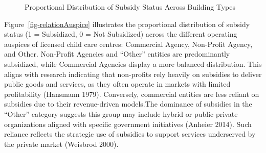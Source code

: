\documentclass[
  letterpaper,
  DIV=11,
  numbers=noendperiod]{scrartcl}
\begin{document}
\begin{figure}


\caption{\label{fig-relationbldgtype}Proportional Distribution of
Subsidy Status Across Building Types}

\end{figure}%

Figure~\ref{fig-relationAuspice} illustrates the proportional
distribution of subsidy status (1 = Subsidized, 0 = Not Subsidized)
across the different operating auspices of licensed child care centres:
Commercial Agency, Non-Profit Agency, and Other. Non-Profit Agencies and
``Other'' entities are predominantly subsidized, while Commercial
Agencies display a more balanced distribution. This aligns with research
indicating that non-profits rely heavily on subsidies to deliver public
goods and services, as they often operate in markets with limited
profitability (Hansmann 1979). Conversely, commercial entities are less
reliant on subsidies due to their revenue-driven models.The dominance of
subsidies in the ``Other'' category suggests this group may include
hybrid or public-private organizations aligned with specific government
initiatives (Anheier 2014). Such reliance reflects the strategic use of
subsidies to support services underserved by the private market
(Weisbrod 2000).
\end{document}
